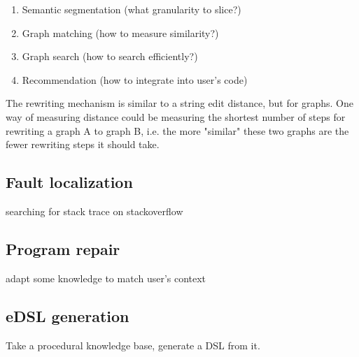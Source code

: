 \documentclass[11pt]{article}
\begin{document}
    \begin{enumerate}
    \item Semantic segmentation (what granularity to slice?)
    \item Graph matching (how to measure similarity?)
    \item Graph search (how to search efficiently?)
    \item Recommendation (how to integrate into user's code)
    \end{enumerate}

    The rewriting mechanism is similar to a string edit distance, but for graphs. One way of measuring distance could be measuring the shortest number of steps for rewriting a graph A to graph B, i.e. the more "similar" these two graphs are the fewer rewriting steps it should take.

    \subsection{Fault localization}

    searching for stack trace on stackoverflow

    \subsection{Program repair}

    adapt some knowledge to match user's context

    \subsection{eDSL generation}

    Take a procedural knowledge base, generate a DSL from it.

    \pagebreak
    
    
\end{document}
